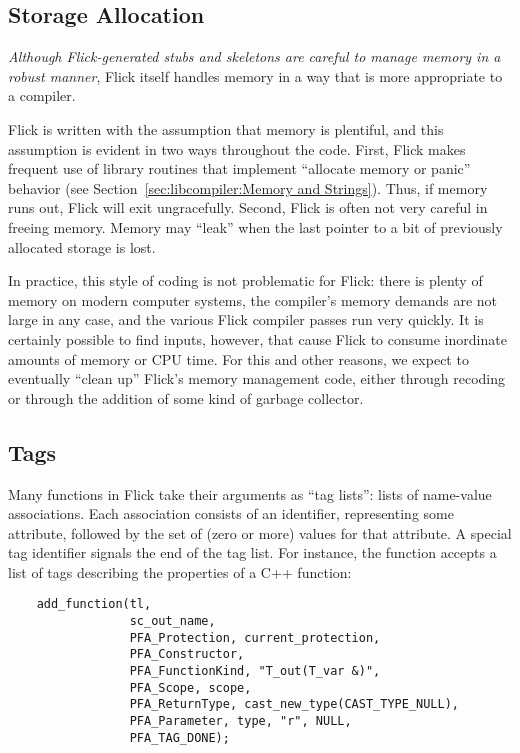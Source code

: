

\subsection{Storage Allocation}
\label{subsec:Coding:Storage Allocation}

\emph{Although Flick-generated stubs and skeletons are careful to manage memory
in a robust manner}, Flick itself handles memory in a way that is more
appropriate to a compiler.

Flick is written with the assumption that memory is plentiful, and this
assumption is evident in two ways throughout the code.  First, Flick makes
frequent use of library routines that implement ``allocate memory or panic''
behavior (see Section~\ref{sec:libcompiler:Memory and Strings}).  Thus, if
memory runs out, Flick will exit ungracefully.  Second, Flick is often not very
careful in freeing memory.  Memory may ``leak'' when the last pointer to a bit
of previously allocated storage is lost.

In practice, this style of coding is not problematic for Flick: there is plenty
of memory on modern computer systems, the compiler's memory demands are not
large in any case, and the various Flick compiler passes run very quickly.  It
is certainly possible to find \IDL{} inputs, however, that cause Flick to
consume inordinate amounts of memory or CPU time.  For this and other reasons,
we expect to eventually ``clean up'' Flick's memory management code, either
through recoding or through the addition of some kind of garbage collector.



\subsection{Tags}
\label{subsec:Coding:Tags}

Many functions in Flick take their arguments as ``tag lists'': lists of
name-value associations.  Each association consists of an identifier,
representing some attribute, followed by the set of (zero or more) values for
that attribute.  A special tag identifier signals the end of the tag list.  For
instance, the function  accepts a list of tags
describing the properties of a C++ function:

\begin{verbatim}
    add_function(tl,
                 sc_out_name,
                 PFA_Protection, current_protection,
                 PFA_Constructor,
                 PFA_FunctionKind, "T_out(T_var &)",
                 PFA_Scope, scope,
                 PFA_ReturnType, cast_new_type(CAST_TYPE_NULL),
                 PFA_Parameter, type, "r", NULL,
                 PFA_TAG_DONE);
\end{verbatim}

